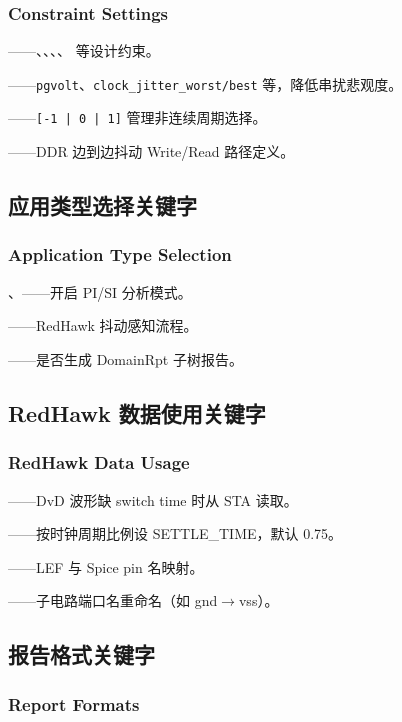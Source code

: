 \subsubsection*{Constraint Settings}

——、、、、 等设计约束。

——\texttt{pgvolt}、\texttt{clock\_jitter\_worst/best} 等，降低串扰悲观度。

——\texttt{[-1 | 0 | 1]} 管理非连续周期选择。

——DDR 边到边抖动 Write/Read 路径定义。

\subsection{应用类型选择关键字}
\subsubsection*{Application Type Selection}

、——开启 PI/SI 分析模式。

——RedHawk 抖动感知流程。

——是否生成 DomainRpt 子树报告。

\subsection{RedHawk 数据使用关键字}
\subsubsection*{RedHawk Data Usage}

——DvD 波形缺 switch time 时从 STA 读取。

——按时钟周期比例设 SETTLE\_TIME，默认 0.75。

——LEF 与 Spice pin 名映射。

——子电路端口名重命名（如 gnd$\rightarrow$vss）。

\subsection{报告格式关键字}
\subsubsection*{Report Formats}

